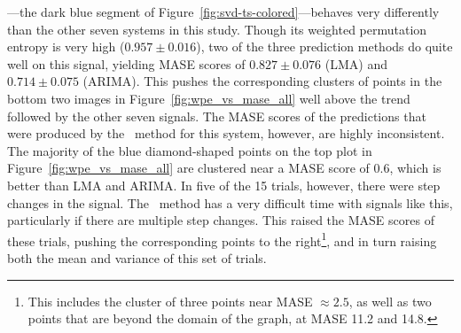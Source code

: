 \svdone---the dark blue segment of
Figure~\ref{fig:svd-ts-colored}---behaves very differently than the
other seven systems in this study.  Though its weighted permutation
entropy is very high ($0.957 \pm 0.016$), two of the three prediction
methods do quite well on this signal, yielding MASE scores of $0.827
\pm 0.076$ (LMA) and $0.714 \pm 0.075$ (ARIMA).  This pushes the
corresponding clusters of points in the bottom two images in
Figure~\ref{fig:wpe_vs_mase_all} well above the trend followed by the
other seven signals.  The MASE scores of the predictions that were
produced by the \naive ~method for this system, however, are highly
inconsistent.  The majority of the blue diamond-shaped points on the
top plot in Figure~\ref{fig:wpe_vs_mase_all} are clustered near a MASE
score of 0.6, which is better than LMA and ARIMA.  In five of the 15
\svdone trials, however, there were step changes in the signal.  The
\naive ~method has a very difficult time with signals like this,
particularly if there are multiple step changes.  This raised the MASE
scores of these trials, pushing the corresponding points to the
right\footnote{This includes the cluster of three points near MASE
  $\approx 2.5$, as well as two points that are beyond the domain of
  the graph, at MASE 11.2 and 14.8.}, and in turn raising both the
mean and variance of this set of trials.


